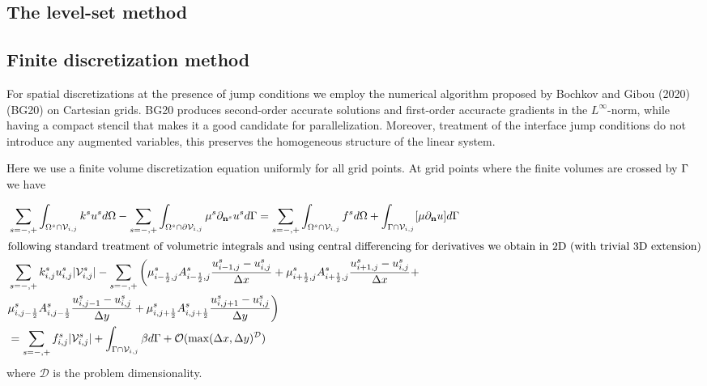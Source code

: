 \documentclass{elsarticle}
\begin{document}
\subsection{The level-set method}

\subsection{Finite discretization method}

For spatial discretizations at the presence of jump conditions we employ the numerical algorithm proposed by Bochkov and Gibou (2020) \cite{bochkov2020solving} (BG20) on Cartesian grids. BG20 produces second-order accurate solutions and first-order accuracte gradients in the $L^\infty$-norm, while having a compact stencil that makes it a good candidate for parallelization. Moreover, treatment of the interface jump conditions do not introduce any augmented variables, this preserves the homogeneous structure of the linear system.

Here we use a finite volume discretization equation uniformly for all grid points. At grid points where the finite volumes are crossed by $\rm \Gamma$ we have

\begin{align*}
	 & \sum_{s=-,+}\int_{\Omega^s \cap \mathcal{V}_{i,j}}  k^{s} u^{s} d\Omega -\sum_{s=-,+} \int_{\Omega^s\cap \partial\mathcal{V}_{i,j}} \mu^{s}\partial_{\mathbf{n}^s} u^s  d\Gamma = \sum_{s=-,+}\int_{\Omega^s \cap \mathcal{V}_{i,j}}  f^{s} d\Omega + \int_{\Gamma \cap \mathcal{V}_{i,j}}[\mu\partial_{\mathbf{n}}u]d\Gamma \\
	\intertext{following standard treatment of volumetric integrals and using central differencing for derivatives we obtain in 2D (with trivial 3D extension)}
	 & \sum_{s=-,+} k_{i,j}^s u_{i,j}^{s} |\mathcal{V}_{i,j}^s| - \sum_{s=-,+}\bigg( \mu_{i-\frac{1}{2},j}^s A_{i-\frac{1}{2},j}^s\frac{u_{i-1,j}^s - u_{i,j}^s}{\Delta x}     +   \mu_{i+\frac{1}{2},j}^s A_{i+\frac{1}{2},j}^s\frac{u_{i+1,j}^s - u_{i,j}^s}{\Delta x} +                                                          \\
	 & \mu_{i, j-\frac{1}{2}}^s A_{i, j-\frac{1}{2}}^s\frac{u_{i,j-1}^s - u_{i,j}^s}{\Delta y} + \mu_{i, j+\frac{1}{2}}^s A_{i, j+\frac{1}{2}}^s\frac{u_{i,j+1}^s - u_{i,j}^s}{\Delta y} \bigg)                                                                                                                                     \\
	 & =  \sum_{s=-,+} f_{i,j}^{s} |\mathcal{V}_{i,j}^s| + \int_{\Gamma\cap \mathcal{V}_{i,j}} \beta d\Gamma + \mathcal{O}(\max(\Delta x, \Delta y)^\mathcal{D})
\end{align*}
where $\mathcal{D}$ is the problem dimensionality.
\end{document}
